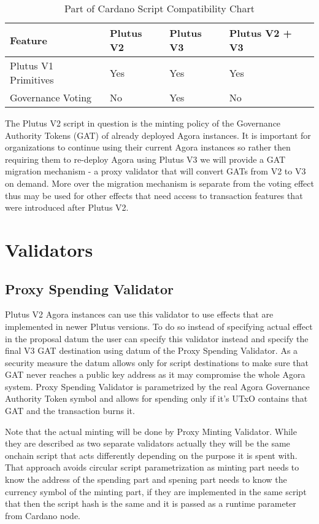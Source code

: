 \documentclass{article}
\begin{document}
\begin{table}[H]
  \centering
  \begin{tabular}{l|l|l|l}
    Feature              & Plutus V2 & Plutus V3 & Plutus V2 + V3 \\
    \hline
    Plutus V1 Primitives & Yes       & Yes       & Yes            \\
    Governance Voting    & No        & Yes       & No             \\
  \end{tabular}
  \caption{\label{tab:compatibility}Part of Cardano Script Compatibility Chart}
\end{table}

The Plutus V2 script in question is the minting policy of the Governance Authority Tokens (GAT) of already deployed Agora instances.
It is important for organizations to continue using their current Agora instances so rather then requiring them to re-deploy Agora using Plutus V3 we will provide a GAT migration mechanism - a proxy validator that will convert GATs from V2 to V3 on demand.
More over the migration mechanism is separate from the voting effect thus may be used for other effects that need access to transaction features that were introduced after Plutus V2.

\section{Validators}

\subsection{Proxy Spending Validator}

Plutus V2 Agora instances can use this validator to use effects that are implemented in newer Plutus versions.
To do so instead of specifying actual effect in the proposal datum the user can specify this validator instead and specify the final V3 GAT destination using datum of the Proxy Spending Validator.
As a security measure the datum allows only for script destinations to make sure that GAT never reaches a public key address as it may compromise the whole Agora system.
Proxy Spending Validator is parametrized by the real Agora Governance Authority Token symbol and allows for spending only if it's UTxO contains that GAT and the transaction burns it.

Note that the actual minting will be done by Proxy Minting Validator.
While they are described as two separate validators actually they will be the same onchain script that acts differently depending on the purpose it is spent with.
That approach avoids circular script parametrization as minting part needs to know the address of the spending part and spening part needs to know the currency symbol of the minting part, if they are implemented in the same script that then the script hash is the same and it is passed as a runtime parameter from Cardano node.
\end{document}
